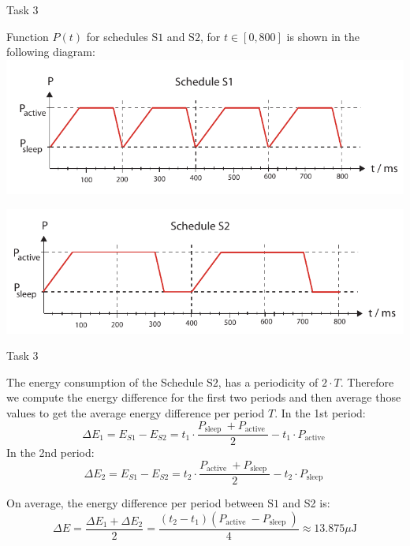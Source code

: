 \begin{frame}[allowframebreaks]{Task 3}{}
  \begin{solutionnoinc}
    Function $P(t)$ for schedules $\mathrm{S} 1$ and $\mathrm{S} 2$, for $t \in[0,800]$ is shown in the following diagram:
    \includegraphics[width=\textwidth]{./figures/task3_2_1.png}
  \end{solutionnoinc}
  \begin{solution}
    \includegraphics[width=\textwidth]{./figures/task3_2_2.png}
  \end{solution}
\end{frame}

\begin{frame}[allowframebreaks]{Task 3}{}
  \begin{solutionnoinc}
    The energy consumption of the Schedule $\mathrm{S} 2$, has a periodicity of $2 \cdot T$. Therefore we compute the energy difference for the first two periods and then average those values to get the average energy difference per period $T$. In the 1st period:
    \[
    \Delta E_1=E_{S 1}-E_{S 2}=t_1 \cdot \frac{P_{\text {sleep }}+P_{\text {active }}}{2}-t_1 \cdot P_{\text {active }}
    \]
    In the 2nd period:
    \[
    \Delta E_2=E_{S 1}-E_{S 2}=t_2 \cdot \frac{P_{\text {active }}+P_{\text {sleep }}}{2}-t_2 \cdot P_{\text {sleep }}
    \]
  \end{solutionnoinc}
  \begin{solution}
    On average, the energy difference per period between $\mathrm{S} 1$ and S2 is:
    \[
    \Delta E=\frac{\Delta E_1+\Delta E_2}{2}=\frac{\left(t_2-t_1\right)\left(P_{\text {active }}-P_{\text {sleep }}\right)}{4} \approx 13.875 \mu \mathrm{J}
    \]
  \end{solution}
\end{frame}

